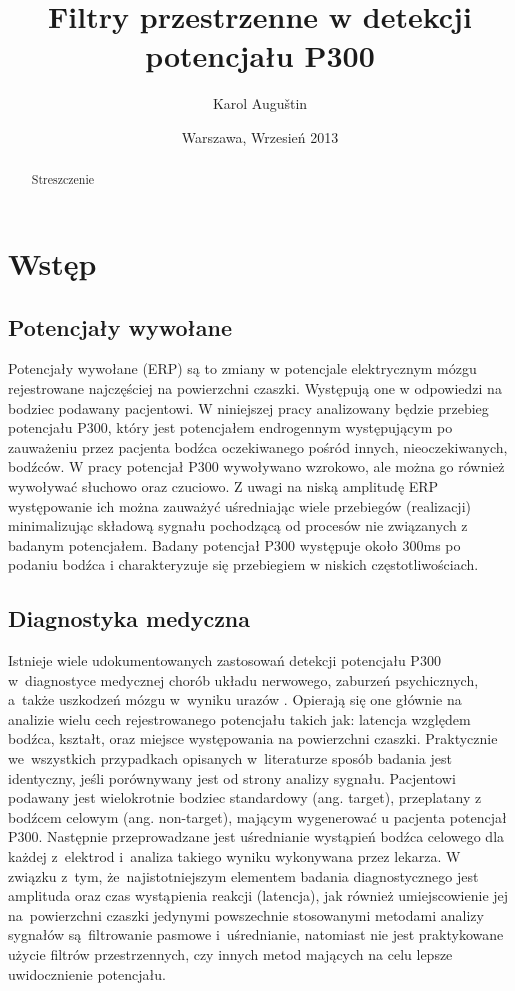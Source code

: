 \documentclass[licencjacka,openright]{pracamgr}
\author{ Karol Auguštin }
\title{ Filtry przestrzenne w detekcji potencjału P300 }
\date{Warszawa, Wrzesień 2013}
\begin{document}
\let\cleardoublepage\clearpage
\maketitle
\begin{abstract}
\par Streszczenie 
\end{abstract}
\tableofcontents


\chapter{Wstęp}
\section{Potencjały wywołane}
\label{potencjaly}
Potencjały wywołane (ERP) są to zmiany w potencjale elektrycznym mózgu rejestrowane najczęściej na powierzchni czaszki. Występują one w odpowiedzi na bodziec podawany pacjentowi. W niniejszej pracy analizowany będzie przebieg potencjału P300, który jest potencjałem endrogennym występującym po zauważeniu przez pacjenta bodźca oczekiwanego pośród innych, nieoczekiwanych, bodźców. W pracy potencjał P300 wywoływano wzrokowo, ale można go również wywoływać słuchowo oraz czuciowo. 
Z uwagi na niską amplitudę ERP występowanie ich można zauważyć uśredniając wiele przebiegów (realizacji) minimalizując składową sygnału pochodzącą od procesów nie związanych z badanym potencjałem.
Badany potencjał P300 występuje około 300ms po podaniu bodźca i charakteryzuje się przebiegiem w niskich częstotliwościach. 

\section{Diagnostyka medyczna}
Istnieje wiele udokumentowanych zastosowań detekcji potencjału P300 w~diagnostyce medycznej chorób układu nerwowego, zaburzeń psychicznych, a~także uszkodzeń mózgu w~wyniku urazów \citep{zgorzalewicz2000}. Opierają się one głównie na analizie wielu cech rejestrowanego potencjału takich jak: latencja względem bodźca, kształt, oraz miejsce występowania na powierzchni czaszki. Praktycznie we~wszystkich przypadkach opisanych w~literaturze sposób badania jest identyczny, jeśli porównywany jest od strony analizy sygnału. Pacjentowi podawany jest wielokrotnie bodziec standardowy (ang. target), przeplatany z bodźcem celowym (ang. non-target), mającym wygenerować u pacjenta potencjał P300. Następnie przeprowadzane jest uśrednianie wystąpień bodźca celowego dla każdej z~elektrod i~analiza takiego wyniku wykonywana przez lekarza. 
W związku z~tym, że~najistotniejszym elementem badania diagnostycznego jest amplituda oraz czas wystąpienia reakcji (latencja), jak również umiejscowienie jej na~powierzchni czaszki \citep{chudzik2004} jedynymi powszechnie stosowanymi metodami analizy sygnałów są~filtrowanie pasmowe i~uśrednianie, natomiast nie jest praktykowane użycie filtrów przestrzennych, czy innych metod mających na celu lepsze uwidocznienie potencjału.
\end{document}
